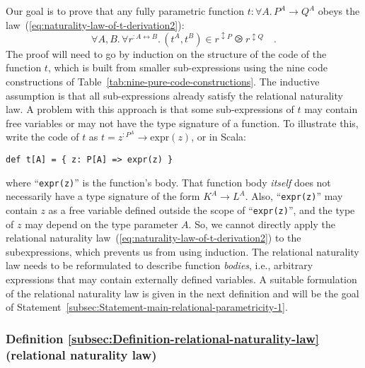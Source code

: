 Our goal is to prove that any fully parametric function $t:\forall A.\,P^{A}\rightarrow Q^{A}$
obeys the law~(\ref{eq:naturality-law-of-t-derivation2}):
\[
\forall A,B.\,\forall r^{:A\leftrightarrow B}.\,(t^{A},t^{B})\in r^{\updownarrow P}\ogreaterthan r^{\updownarrow Q}\quad.
\]
The proof will need to go by induction on the structure of the code
of the function $t$, which is built from smaller sub-expressions
using the nine code constructions of Table~\ref{tab:nine-pure-code-constructions}.
The inductive assumption is that all sub-expressions already satisfy
the relational naturality law. A problem with this approach is that
some sub-expressions of $t$ may contain free variables or may not
have the type signature of a function. To illustrate this, write the
code of $t$ as $t=z^{:P^{A}}\rightarrow\text{expr}(z)$, or in Scala:
\begin{lstlisting}
def t[A] = { z: P[A] => expr(z) }
\end{lstlisting}
where \textsf{``}\lstinline!expr(z)!\textsf{''} is the function\textsf{'}s body. That function
body \emph{itself} does not necessarily have a type signature of the
form $K^{A}\rightarrow L^{A}$. Also, \textsf{``}\lstinline!expr(z)!\textsf{''} may
contain $z$ as a free variable defined outside the scope of \textsf{``}\lstinline!expr(z)!\textsf{''},
and the type of $z$ may depend on the type parameter $A$. So, we
cannot directly apply the relational naturality law~(\ref{eq:naturality-law-of-t-derivation2})
to the subexpressions, which prevents us from using induction. The
relational naturality law needs to be reformulated to describe function
\emph{bodies}, i.e., arbitrary expressions that may contain externally
defined variables. A suitable formulation of the relational naturality
law is given in the next definition and will be the goal of Statement~\ref{subsec:Statement-main-relational-parametricity-1}.

\subsubsection{Definition \label{subsec:Definition-relational-naturality-law}\ref{subsec:Definition-relational-naturality-law}
(relational naturality law)}

